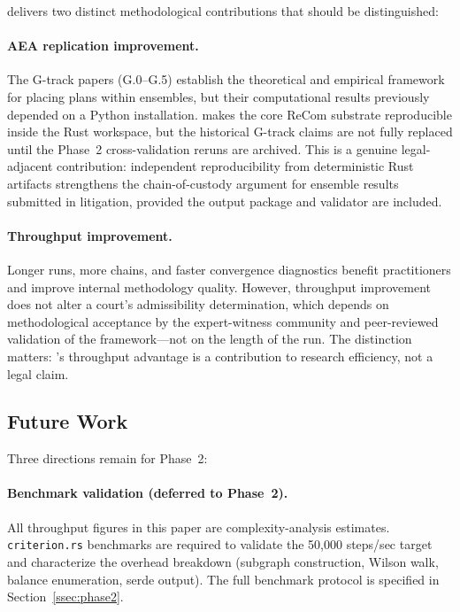 \re{} delivers two distinct methodological contributions that should be
distinguished:

\paragraph{AEA replication improvement.}
The G-track papers (G.0--G.5) establish the theoretical and empirical
framework for placing \ar{} plans within \recom{} ensembles, but their
computational results previously depended on a Python \gc{} installation.
\re{} makes the core ReCom substrate reproducible inside the Rust workspace,
but the historical G-track claims are not fully replaced until the Phase~2
cross-validation reruns are archived.
This is a genuine legal-adjacent contribution: independent reproducibility
from deterministic Rust artifacts strengthens the chain-of-custody argument
for ensemble results submitted in litigation, provided the output package and
validator are included.

\paragraph{Throughput improvement.}
Longer runs, more chains, and faster convergence diagnostics benefit
practitioners and improve internal methodology quality.
However, throughput improvement does not alter a court's admissibility
determination, which depends on methodological acceptance by the
expert-witness community and peer-reviewed validation of the \recom{}
framework---not on the length of the run.
The distinction matters: \re{}'s throughput advantage is a contribution
to research efficiency, not a legal claim.

\subsection{Future Work}

Three directions remain for Phase~2:

\paragraph{Benchmark validation (deferred to Phase~2).}
All throughput figures in this paper are complexity-analysis estimates.
\texttt{criterion.rs} benchmarks are required to validate the 50{,}000
steps/sec target and characterize the overhead breakdown (subgraph
construction, Wilson walk, balance enumeration, serde output).
The full benchmark protocol is specified in Section~\ref{ssec:phase2}.

